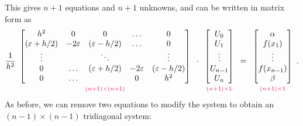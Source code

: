This gives $n+1$ equations and $n+1$ unknowns, and can be written in matrix form as
\[ \frac{1}{h^2}
\begin{array}{c}
\begin{bmatrix}h^2 & 0 &0&\hdots &0 \\ (\epsilon + h/2) &-2\epsilon & (\epsilon - h/2) &\hdots &0\\ \vdots &  & \ddots & &\vdots \\
0 & \hdots & (\epsilon + h/2) &-2\epsilon & (\epsilon - h/2) \\ 0 & \hdots & & 0 & h^2
\end{bmatrix}\\
{\scriptstyle\textcolor{red}{(n+1)\times(n+1)}}
\end{array}\cdot
\begin{array}{c}
\begin{bmatrix}U_0\\U_1\\ \vdots \\U_{n-1} \\U_{n}\end{bmatrix}\\
{\scriptstyle\textcolor{red}{(n+1)\times1}}
\end{array}=
\begin{array}{c}
\begin{bmatrix}\alpha\\f(x_1)\\ \vdots \\ f(x_{n-1}) \\ \beta \end{bmatrix}\\
{\scriptstyle\textcolor{red}{(n+1)\times1}}
\end{array}.
\]
As before, we can remove two equations to modify the system to obtain an $(n-1)\times (n-1)$ tridiagonal system:
